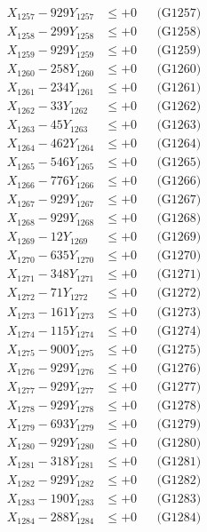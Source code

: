 \documentclass[a4paper,10pt]{article}
\begin{document}
{\begin{align}
X_{1257} - 929Y_{1257} &\leq +0 && \text{(G1257)} \\
X_{1258} - 299Y_{1258} &\leq +0 && \text{(G1258)} \\
X_{1259} - 929Y_{1259} &\leq +0 && \text{(G1259)} \\
X_{1260} - 258Y_{1260} &\leq +0 && \text{(G1260)} \\
\allowbreak
X_{1261} - 234Y_{1261} &\leq +0 && \text{(G1261)} \\
X_{1262} - 33Y_{1262} &\leq +0 && \text{(G1262)} \\
X_{1263} - 45Y_{1263} &\leq +0 && \text{(G1263)} \\
X_{1264} - 462Y_{1264} &\leq +0 && \text{(G1264)} \\
X_{1265} - 546Y_{1265} &\leq +0 && \text{(G1265)} \\
X_{1266} - 776Y_{1266} &\leq +0 && \text{(G1266)} \\
X_{1267} - 929Y_{1267} &\leq +0 && \text{(G1267)} \\
X_{1268} - 929Y_{1268} &\leq +0 && \text{(G1268)} \\
X_{1269} - 12Y_{1269} &\leq +0 && \text{(G1269)} \\
X_{1270} - 635Y_{1270} &\leq +0 && \text{(G1270)} \\
\allowbreak
X_{1271} - 348Y_{1271} &\leq +0 && \text{(G1271)} \\
X_{1272} - 71Y_{1272} &\leq +0 && \text{(G1272)} \\
X_{1273} - 161Y_{1273} &\leq +0 && \text{(G1273)} \\
X_{1274} - 115Y_{1274} &\leq +0 && \text{(G1274)} \\
X_{1275} - 900Y_{1275} &\leq +0 && \text{(G1275)} \\
X_{1276} - 929Y_{1276} &\leq +0 && \text{(G1276)} \\
X_{1277} - 929Y_{1277} &\leq +0 && \text{(G1277)} \\
X_{1278} - 929Y_{1278} &\leq +0 && \text{(G1278)} \\
X_{1279} - 693Y_{1279} &\leq +0 && \text{(G1279)} \\
X_{1280} - 929Y_{1280} &\leq +0 && \text{(G1280)} \\
\allowbreak
X_{1281} - 318Y_{1281} &\leq +0 && \text{(G1281)} \\
X_{1282} - 929Y_{1282} &\leq +0 && \text{(G1282)} \\
X_{1283} - 190Y_{1283} &\leq +0 && \text{(G1283)} \\
X_{1284} - 288Y_{1284} &\leq +0 && \text{(G1284)} \\

\end{align}}
\end{document}
